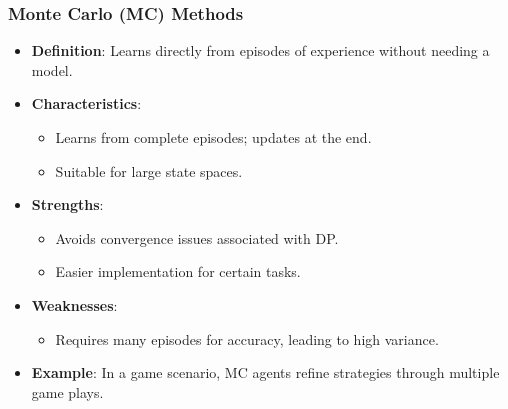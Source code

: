 \documentclass[aspectratio=169]{beamer}
\begin{document}
\begin{frame}[fragile]
    \frametitle{Monte Carlo (MC) Methods}
    \begin{itemize}
        \item \textbf{Definition}: Learns directly from episodes of experience without needing a model.
        \item \textbf{Characteristics}:
        \begin{itemize}
            \item Learns from complete episodes; updates at the end.
            \item Suitable for large state spaces.
        \end{itemize}
        \item \textbf{Strengths}:
        \begin{itemize}
            \item Avoids convergence issues associated with DP.
            \item Easier implementation for certain tasks.
        \end{itemize}
        \item \textbf{Weaknesses}:
        \begin{itemize}
            \item Requires many episodes for accuracy, leading to high variance.
        \end{itemize}
        \item \textbf{Example}: In a game scenario, MC agents refine strategies through multiple game plays.
    \end{itemize}
\end{frame}
\end{document}
